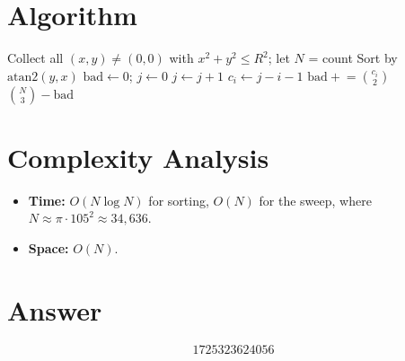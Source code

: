 \documentclass[12pt]{article}
\begin{document}
\section{Algorithm}

\begin{algorithmic}[1]
    \State Collect all $(x,y) \neq (0,0)$ with $x^2 + y^2 \leq R^2$; let $N$ = count
    \State Sort by $\mathrm{atan2}(y, x)$
    \State $\mathrm{bad} \gets 0$; $j \gets 0$
            \State $j \gets j + 1$
        \EndWhile
        \State $c_i \gets j - i - 1$
        \State $\mathrm{bad} \mathrel{+}= \binom{c_i}{2}$
    \EndFor
    \State \Return $\binom{N}{3} - \mathrm{bad}$
\EndFunction
\end{algorithmic}

\section{Complexity Analysis}

\begin{itemize}
    \item \textbf{Time:} $O(N \log N)$ for sorting, $O(N)$ for the sweep, where $N \approx \pi \cdot 105^2 \approx 34{,}636$.
    \item \textbf{Space:} $O(N)$.
\end{itemize}

\section{Answer}

\[
\boxed{1725323624056}
\]
\end{document}
